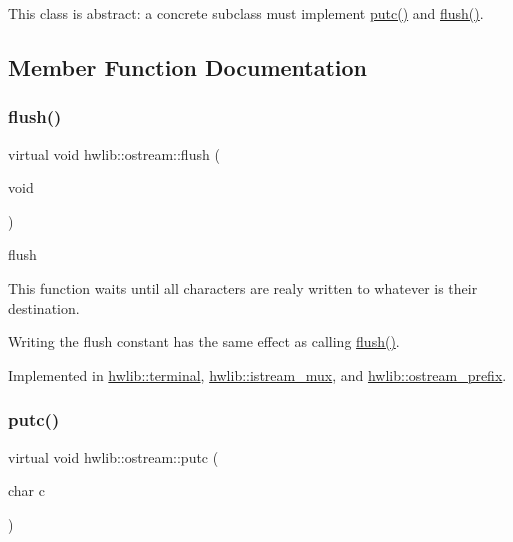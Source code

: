 This class is abstract\+: a concrete subclass must implement \hyperlink{classhwlib_1_1ostream_a3b2b77c9e933b76bd6ddd85b9883a31b}{putc()} and \hyperlink{classhwlib_1_1ostream_a5f43f08159d2733e02805f134598f96a}{flush()}. 

\subsection{Member Function Documentation}
\mbox{\label{classhwlib_1_1ostream_a5f43f08159d2733e02805f134598f96a}} 
\subsubsection{\texorpdfstring{flush()}{flush()}}
{\footnotesize\ttfamily virtual void hwlib\+::ostream\+::flush (\begin{DoxyParamCaption}\item[{void}]{ }\end{DoxyParamCaption})\hspace{0.3cm}{\ttfamily [pure virtual]}}

flush

This function waits until all characters are realy written to whatever is their destination.

Writing the flush constant has the same effect as calling \hyperlink{classhwlib_1_1ostream_a5f43f08159d2733e02805f134598f96a}{flush()}. 

Implemented in \hyperlink{classhwlib_1_1terminal_a541fbb14ebbd1efa59afe84f8903856e}{hwlib\+::terminal}, \hyperlink{classhwlib_1_1istream__mux_a33f8cfde26e1c3dcf2867c2e0fce3582}{hwlib\+::istream\+\_\+mux}, and \hyperlink{classhwlib_1_1ostream__prefix_a1e7f7655a749a24d81aafdc4ef93ac30}{hwlib\+::ostream\+\_\+prefix}.

\mbox{\label{classhwlib_1_1ostream_a3b2b77c9e933b76bd6ddd85b9883a31b}} 
\subsubsection{\texorpdfstring{putc()}{putc()}}
{\footnotesize\ttfamily virtual void hwlib\+::ostream\+::putc (\begin{DoxyParamCaption}\item[{char}]{c }\end{DoxyParamCaption})\hspace{0.3cm}{\ttfamily [pure virtual]}}

